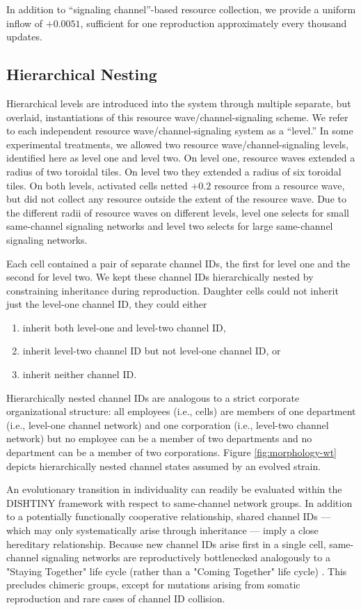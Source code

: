 In addition to ``signaling channel''-based resource collection, we provide a uniform inflow of $+0.0051$, sufficient for one reproduction approximately every thousand updates.

\subsection{Hierarchical Nesting} \label{sup:hierarchical_nesting}

Hierarchical levels are introduced into the system through multiple separate, but overlaid, instantiations of this resource wave/channel-signaling scheme.
We refer to each independent resource wave/channel-signaling system as a ``level.''
In some experimental treatments, we allowed two resource wave/channel-signaling levels, identified here as level one and level two.
On level one, resource waves extended a radius of two toroidal tiles.
On level two they extended a radius of six toroidal tiles.
On both levels, activated cells netted $+0.2$ resource from a resource wave, but did not collect any resource outside the extent of the resource wave.
Due to the different radii of resource waves on different levels, level one selects for small same-channel signaling networks and level two selects for large same-channel signaling networks.

Each cell contained a pair of separate channel IDs, the first for level one and the second for level two.
We kept these channel IDs hierarchically nested by constraining inheritance during reproduction.
Daughter cells could not inherit just the level-one channel ID, they could either
\begin{enumerate}
\item inherit both level-one and level-two channel ID,
\item inherit level-two channel ID but not level-one channel ID, or
\item inherit neither channel ID.
\end{enumerate}
Hierarchically nested channel IDs are analogous to a strict corporate organizational structure: all employees (i.e., cells) are members of one department (i.e., level-one channel network) and one corporation (i.e., level-two channel network) but no employee can be a member of two departments and no department can be a member of two corporations.
Figure \ref{fig:morphology-wt} depicts hierarchically nested channel states assumed by an evolved strain.

An evolutionary transition in individuality can readily be evaluated within the DISHTINY framework with respect to same-channel network groups.
In addition to a potentially functionally cooperative relationship, shared channel IDs --- which may only systematically arise through inheritance --- imply a close hereditary relationship.
Because new channel IDs arise first in a single cell, same-channel signaling networks are reproductively bottlenecked analogously to a "Staying Together" life cycle (rather than a "Coming Together" life cycle) \cite{staps2019emergence}.
This precludes chimeric groups, except for mutations arising from somatic reproduction and rare cases of channel ID collision.

